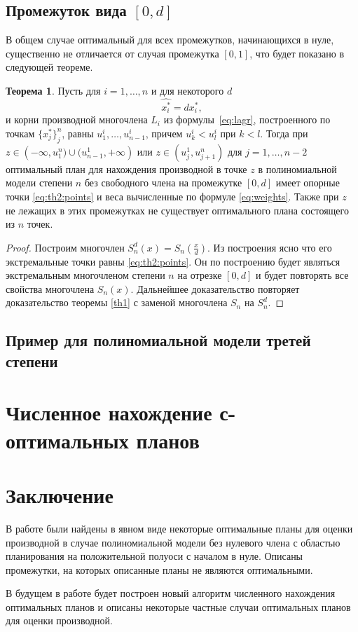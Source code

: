 \documentclass[specialist,
               substylefile = spbu.rtx,
               subf,href,colorlinks=true, 12pt]{disser}
\theoremstyle{definition}
\newtheorem{theorem}{Теорема}
\begin{document}
	\section{Промежуток вида $[0, d]$}
	
	В общем случае оптимальный для всех промежутков, начинающихся в нуле, существенно не отличается от случая промежутка $[0, 1]$, что будет показано в следующей теореме.
	
	\begin{theorem}
		Пусть для $i = 1, \ldots, n$ и для некоторого $d$
		\begin{equation}
			\label{eq:th2:points}
			\widehat{x_i^*} = d x_i^* ,
		\end{equation}
		и корни производной многочлена $L_i$ из формулы~\eqref{eq:lagr}, построенного по точкам $\{x_j^*\}_j^n$, равны $u_1^i, \ldots, u_{n-1}^i$, причем $u_k^i < u_l^i$ при $k < l$. Тогда при $z \in \left(-\infty, u_1^n) \cup (u_{n-1}^1, +\infty \right)$ или $z \in \left( u^1_j, u^n_{j+1} \right)$ для $j=1, \ldots, n-2$ оптимальный план для нахождения производной в точке $z$ в полиномиальной модели степени $n$ без свободного члена на промежутке $[0, d]$ имеет опорные точки \eqref{eq:th2:points} и веса вычисленные по формуле \eqref{eq:weights}. Также при $z$ не лежащих в этих промежутках не существует оптимального плана состоящего из $n$ точек.
	\end{theorem}
	
	\begin{proof}
		Построим многочлен $S_n^d(x) = S_n(\frac{x}{d})$. Из построения ясно что его экстремальные точки равны \eqref{eq:th2:points}. Он по построению будет являться экстремальным многочленом степени $n$ на отрезке $[0, d]$ и будет повторять все свойства многочлена $S_n(x)$. Дальнейшее доказательство повторяет доказательство теоремы \ref{th1} с заменой многочлена $S_n$ на $S_n^d$.
	\end{proof}	
	
	\section{Пример для полиномиальной модели третей степени}
	
\chapter{Численное нахождение с-оптимальных планов}
	
\chapter*{Заключение}
	В работе были найдены в явном виде некоторые оптимальные планы для оценки производной в случае полиномиальной модели без нулевого члена с областью планирования на положительной полуоси с началом в нуле. Описаны промежутки, на которых описанные планы не являются оптимальными.
	
	В будущем в работе будет построен новый алгоритм численного нахождения оптимальных планов и описаны некоторые частные случаи оптимальных планов для оценки производной.
	
	\nocite{*}
	
	
	
\end{document}
